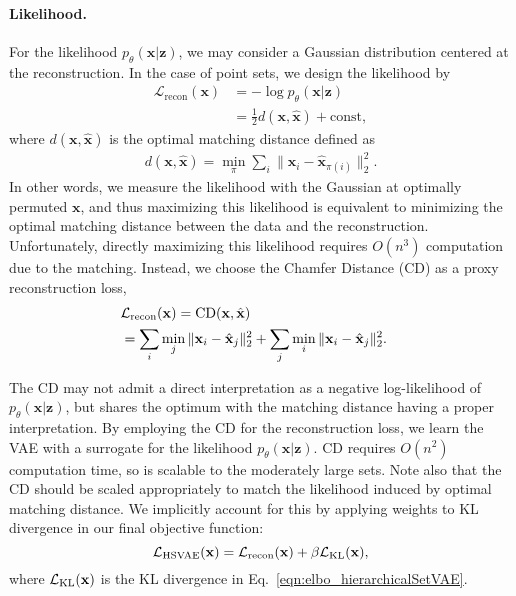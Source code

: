 \documentclass[final]{arxiv/cvpr}
\begin{document}
\paragraph{Likelihood.}
For the likelihood $p_\theta(\mathbf{x}|\mathbf{z})$, we may consider a Gaussian distribution centered at the reconstruction.
In the case of point sets, we design the likelihood by
\begin{align}
    \mathcal{L}_\text{recon}(\mathbf{x}) &= -\log p_\theta(\mathbf{x}|\mathbf{z})  
    \nonumber\\
    &= \frac{1}{2}d(\mathbf{x}, \hat{\mathbf{x}}) + \mathrm{const},
\end{align}
where $d(\mathbf{x}, \hat{\mathbf{x}})$ is the optimal matching distance defined as
\begin{align}
    d(\mathbf{x}, \hat{\mathbf{x}}) = \min_{\pi} {\sum_i}{\| \mathbf{x}_i - \hat{\mathbf{x}}_{\pi(i)}\|_2^2}.
\end{align}
In other words, we measure the likelihood with the Gaussian at optimally permuted $\mathbf{x}$, and thus maximizing this likelihood is equivalent to minimizing the optimal matching distance between the data and the reconstruction. Unfortunately, directly maximizing this likelihood requires $O(n^3)$ computation due to the matching. Instead, we choose the Chamfer Distance (CD) as a proxy reconstruction loss,
\begin{align}
    \lefteqn{\mathcal{L}_\text{recon}(\mathbf{x}) = \textnormal{CD}(\mathbf{x}, \hat{\mathbf{x}})} \nonumber\\
    &= \sum_{i} \min_j \| \mathbf{x}_i - \hat{\mathbf{x}}_j\|_2^2 + \sum_j \min_i \|\mathbf{x}_i - \hat{\mathbf{x}}_j\|_2^2.
    \label{eqn:reconstruction_cd}
\end{align}

The CD may not admit a direct interpretation as a negative log-likelihood of $p_\theta(\mathbf{x}|\mathbf{z})$, but shares the optimum with the matching distance having a proper interpretation. 
By employing the CD for the reconstruction loss, we learn the VAE with a surrogate for the likelihood $p_\theta(\mathbf{x}|\mathbf{z})$.
CD requires $O(n^2)$ computation time, so is scalable to the moderately large sets.
Note also that the CD should be scaled appropriately to match the likelihood induced by optimal matching distance.
We implicitly account for this by applying weights to KL divergence in our final objective function:
\begin{equation}
    \mathcal{L}_{\textnormal{HSVAE}}(\mathbf{x}) = \mathcal{L}_{\textnormal{recon}}(\mathbf{x}) + \beta\mathcal{L}_{\textnormal{KL}}(\mathbf{x}),
    \label{eqn:beta_vae_loss}
\end{equation}
where $\mathcal{L}_{\textnormal{KL}}(\mathbf{x})$ is the KL divergence in Eq.~\eqref{eqn:elbo_hierarchicalSetVAE}.
\end{document}
